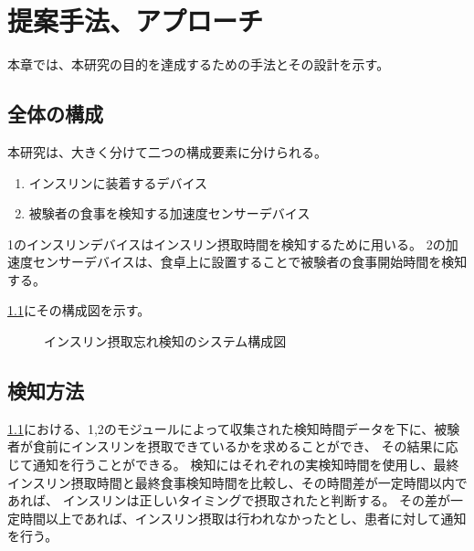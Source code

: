 \chapter{提案手法、アプローチ}
\label{chap:design}

本章では、本研究の目的を達成するための手法とその設計を示す。

\section{全体の構成}
本研究は、大きく分けて二つの構成要素に分けられる。

\begin{enumerate}
  \item インスリンに装着するデバイス
  \item 被験者の食事を検知する加速度センサーデバイス
\end{enumerate}

1のインスリンデバイスはインスリン摂取時間を検知するために用いる。
2の加速度センサーデバイスは、食卓上に設置することで被験者の食事開始時間を検知する。

\ref{fig:insulin_design}にその構成図を示す。

\begin{figure}
  \caption{インスリン摂取忘れ検知のシステム構成図}
  \label{fig:insulin_design}
  \begin{center}
  \end{center}
\end{figure}

\section{検知方法}

\ref{fig:insulin_design}における、1,2のモジュールによって収集された検知時間データを下に、被験者が食前にインスリンを摂取できているかを求めることができ、
その結果に応じて通知を行うことができる。
検知にはそれぞれの実検知時間を使用し、最終インスリン摂取時間と最終食事検知時間を比較し、その時間差が一定時間以内であれば、
インスリンは正しいタイミングで摂取されたと判断する。
その差が一定時間以上であれば、インスリン摂取は行われなかったとし、患者に対して通知を行う。

